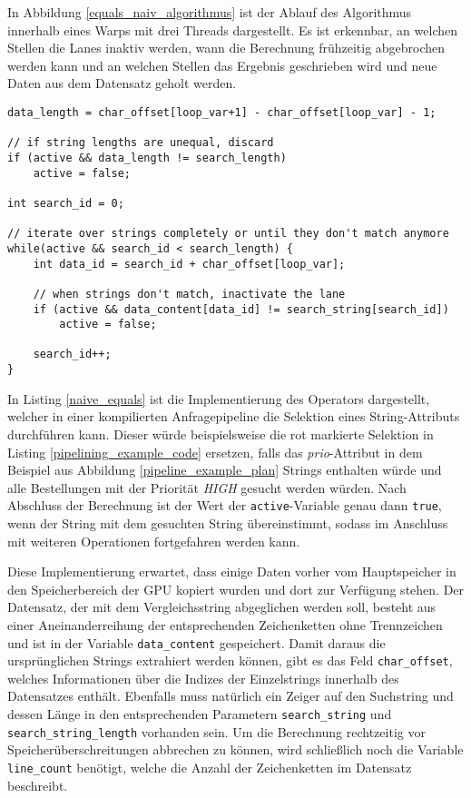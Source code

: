 In Abbildung \ref{equals_naiv_algorithmus} ist der Ablauf des Algorithmus innerhalb eines Warps mit drei Threads dargestellt.
Es ist erkennbar, an welchen Stellen die Lanes inaktiv werden, wann die Berechnung frühzeitig abgebrochen werden kann und an welchen Stellen das Ergebnis geschrieben wird und neue Daten aus dem Datensatz geholt werden.

\newpage

\begin{lstlisting}[language=MyC++,
	caption=Naive Implementierung einer Selektion von Strings,
	label=naive_equals]
data_length = char_offset[loop_var+1] - char_offset[loop_var] - 1;

// if string lengths are unequal, discard
if (active && data_length != search_length)
	active = false;

int search_id = 0;

// iterate over strings completely or until they don't match anymore
while(active && search_id < search_length) {
	int data_id = search_id + char_offset[loop_var];
	
	// when strings don't match, inactivate the lane
	if (active && data_content[data_id] != search_string[search_id])
		active = false;
	
	search_id++;
}
\end{lstlisting}

In Listing \ref{naive_equals} ist die Implementierung des Operators dargestellt, welcher in einer kompilierten Anfragepipeline die Selektion eines String-Attributs durchführen kann.
Dieser würde beispielsweise die rot markierte Selektion in Listing \ref{pipelining_example_code} ersetzen, falls das \emph{prio}-Attribut in dem Beispiel aus Abbildung \ref{pipeline_example_plan} Strings enthalten würde und alle Bestellungen mit der Priorität \emph{HIGH} gesucht werden würden.
Nach Abschluss der Berechnung ist der Wert der \texttt{active}-Variable genau dann \texttt{true}, wenn der String mit dem gesuchten String übereinstimmt, sodass im Anschluss mit weiteren Operationen fortgefahren werden kann.

Diese Implementierung erwartet, dass einige Daten vorher vom Hauptspeicher in den Speicherbereich der GPU kopiert wurden und dort zur Verfügung stehen.
Der Datensatz, der mit dem Vergleichsstring abgeglichen werden soll, besteht aus einer Aneinanderreihung der entsprechenden Zeichenketten ohne Trennzeichen und ist in der Variable \texttt{data\_content} gespeichert.
Damit daraus die ursprünglichen Strings extrahiert werden können, gibt es das Feld \texttt{char\_offset}, welches Informationen über die Indizes der Einzelstrings innerhalb des Datensatzes enthält.
Ebenfalls muss natürlich ein Zeiger auf den Suchstring und dessen Länge in den entsprechenden Parametern \texttt{search\_string} und \texttt{search\_string\_length} vorhanden sein.
Um die Berechnung rechtzeitig vor Speicherüberschreitungen abbrechen zu können, wird schließlich noch die Variable \texttt{line\_count} benötigt, welche die Anzahl der Zeichenketten im Datensatz beschreibt.

